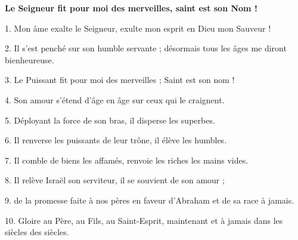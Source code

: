 \textbf{
Le Seigneur fit pour moi des merveilles, saint est son Nom !
}

1.
Mon âme exalte le Seigneur,
exulte mon esprit en Dieu mon Sauveur !

2.
Il s'est penché sur son humble servante ;
désormais tous les âges me diront bienheureuse.

3.
Le Puissant fit pour moi des merveilles ;
Saint est son nom !

4.
Son amour s'étend d'âge en âge
sur ceux qui le craignent.

5.
Déployant la force de son bras,
il disperse les superbes.

6.
Il renverse les puissants de leur trône,
il élève les humbles.

7.
Il comble de biens les affamés,
renvoie les riches les mains vides.

8.
Il relève Israël son serviteur,
il se souvient de son amour ;

9.
de la promesse faite à nos pères
en faveur d'Abraham et de sa race à jamais.

10.
Gloire au Père, au Fils, au Saint-Esprit,
maintenant et à jamais dans les siècles des siècles.


